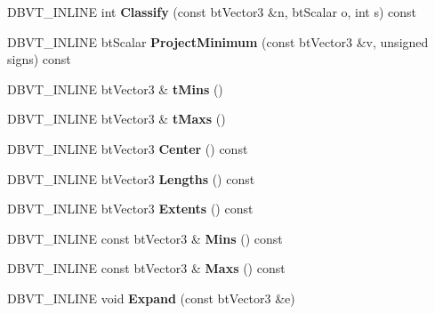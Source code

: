 \begin{DoxyCompactItemize}
\item 
\mbox{\label{structbtDbvtAabbMm_a90e11fdfb7f049dcb55cb15d4565fc10}} 
D\+B\+V\+T\+\_\+\+I\+N\+L\+I\+NE int {\bfseries Classify} (const bt\+Vector3 \&n, bt\+Scalar o, int s) const
\item 
\mbox{\label{structbtDbvtAabbMm_a083b04e78a333d020cfcd5446a0a00ef}} 
D\+B\+V\+T\+\_\+\+I\+N\+L\+I\+NE bt\+Scalar {\bfseries Project\+Minimum} (const bt\+Vector3 \&v, unsigned signs) const
\item 
\mbox{\label{structbtDbvtAabbMm_ad920901ffab4ca5cad8692e71aca0399}} 
D\+B\+V\+T\+\_\+\+I\+N\+L\+I\+NE bt\+Vector3 \& {\bfseries t\+Mins} ()
\item 
\mbox{\label{structbtDbvtAabbMm_a96df1c148eecb1df8be67d9b7271f2da}} 
D\+B\+V\+T\+\_\+\+I\+N\+L\+I\+NE bt\+Vector3 \& {\bfseries t\+Maxs} ()
\item 
\mbox{\label{structbtDbvtAabbMm_a9bc59550ceba800557807ea7f72d6f38}} 
D\+B\+V\+T\+\_\+\+I\+N\+L\+I\+NE bt\+Vector3 {\bfseries Center} () const
\item 
\mbox{\label{structbtDbvtAabbMm_ad0adbdb7c01ecd4a677f01382a19177f}} 
D\+B\+V\+T\+\_\+\+I\+N\+L\+I\+NE bt\+Vector3 {\bfseries Lengths} () const
\item 
\mbox{\label{structbtDbvtAabbMm_a703ebccab5b8b4c52b33fc38f8aa0557}} 
D\+B\+V\+T\+\_\+\+I\+N\+L\+I\+NE bt\+Vector3 {\bfseries Extents} () const
\item 
\mbox{\label{structbtDbvtAabbMm_a68e5ce79a4b62f9251406cd97347afa3}} 
D\+B\+V\+T\+\_\+\+I\+N\+L\+I\+NE const bt\+Vector3 \& {\bfseries Mins} () const
\item 
\mbox{\label{structbtDbvtAabbMm_aa9fe9a4b650c2743debf7d73785db838}} 
D\+B\+V\+T\+\_\+\+I\+N\+L\+I\+NE const bt\+Vector3 \& {\bfseries Maxs} () const
\item 
\mbox{\label{structbtDbvtAabbMm_a93bf0a81247ad642fdc6b0213b0ed68b}} 
D\+B\+V\+T\+\_\+\+I\+N\+L\+I\+NE void {\bfseries Expand} (const bt\+Vector3 \&e)

\end{DoxyCompactItemize}
